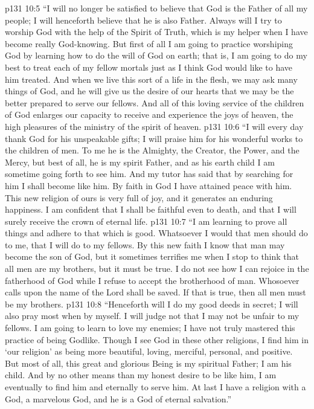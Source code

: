 \vs p131 10:5 “I will no longer be satisfied to believe that God is the Father of all my people; I will henceforth believe that he is also  Father. Always will I try to worship God with the help of the Spirit of Truth, which is my helper when I have become really God\hyp{}knowing. But first of all I am going to practice worshiping God by learning how to do the will of God on earth; that is, I am going to do my best to treat each of my fellow mortals just as I think God would like to have him treated. And when we live this sort of a life in the flesh, we may ask many things of God, and he will give us the desire of our hearts that we may be the better prepared to serve our fellows. And all of this loving service of the children of God enlarges our capacity to receive and experience the joys of heaven, the high pleasures of the ministry of the spirit of heaven.
\vs p131 10:6 “I will every day thank God for his unspeakable gifts; I will praise him for his wonderful works to the children of men. To me he is the Almighty, the Creator, the Power, and the Mercy, but best of all, he is my spirit Father, and as his earth child I am sometime going forth to see him. And my tutor has said that by searching for him I shall become like him. By faith in God I have attained peace with him. This new religion of ours is very full of joy, and it generates an enduring happiness. I am confident that I shall be faithful even to death, and that I will surely receive the crown of eternal life.
\vs p131 10:7 “I am learning to prove all things and adhere to that which is good. Whatsoever I would that men should do to me, that I will do to my fellows. By this new faith I know that man may become the son of God, but it sometimes terrifies me when I stop to think that all men are my brothers, but it must be true. I do not see how I can rejoice in the fatherhood of God while I refuse to accept the brotherhood of man. Whosoever calls upon the name of the Lord shall be saved. If that is true, then all men must be my brothers.
\vs p131 10:8 “Henceforth will I do my good deeds in secret; I will also pray most when by myself. I will judge not that I may not be unfair to my fellows. I am going to learn to love my enemies; I have not truly mastered this practice of being Godlike. Though I see God in these other religions, I find him in ‘our religion’ as being more beautiful, loving, merciful, personal, and positive. But most of all, this great and glorious Being is my spiritual Father; I am his child. And by no other means than my honest desire to be like him, I am eventually to find him and eternally to serve him. At last I have a religion with a God, a marvelous God, and he is a God of eternal salvation.”
